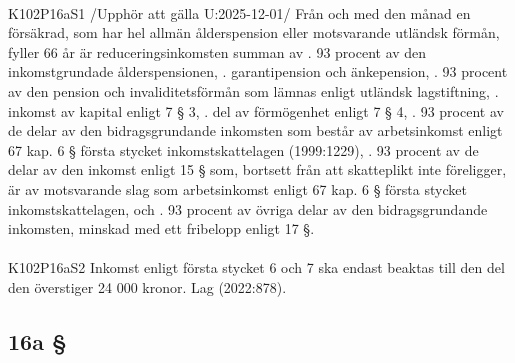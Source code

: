 \documentclass[a4paper,notitlepage,openany,10pt]{book}
\begin{document}
\paragraph*{}
{\tiny K102P16aS1}
/Upphör att gälla U:2025-12-01/
Från och med den månad en försäkrad, som har hel allmän ålderspension eller motsvarande utländsk förmån, fyller 66 år är reduceringsinkomsten summan av
. 93 procent av den inkomstgrundade ålderspensionen,
. garantipension och änkepension,
. 93 procent av den pension och invaliditetsförmån som lämnas enligt utländsk lagstiftning,
. inkomst av kapital enligt 7 § 3,
. del av förmögenhet enligt 7 § 4,
. 93 procent av de delar av den bidragsgrundande inkomsten som består av arbetsinkomst enligt 67 kap. 6 § första stycket inkomstskattelagen (1999:1229),
. 93 procent av de delar av den inkomst enligt 15 § som, bortsett från att skatteplikt inte föreligger, är av motsvarande slag som arbetsinkomst enligt 67 kap. 6 § första stycket inkomstskattelagen, och
. 93 procent av övriga delar av den bidragsgrundande inkomsten, minskad med ett fribelopp enligt 17 §.
\paragraph*{}
{\tiny K102P16aS2}
Inkomst enligt första stycket 6 och 7 ska endast beaktas till den del den överstiger 24 000 kronor.
Lag (2022:878).
\subsection*{16a §}
\end{document}

